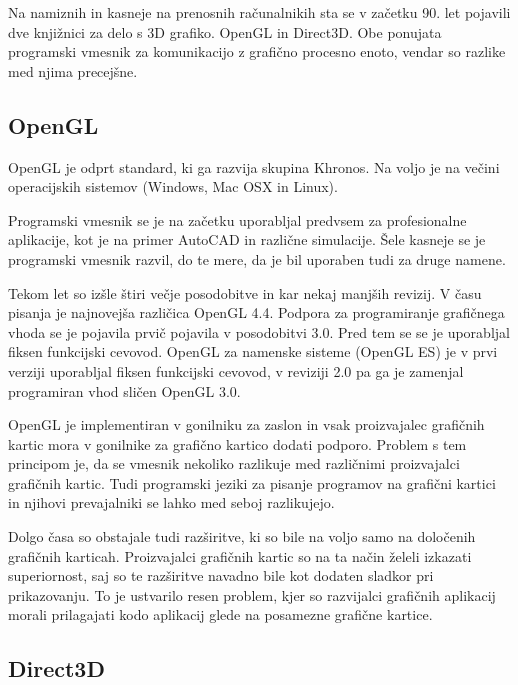 Na namiznih in kasneje na prenosnih računalnikih sta se v začetku 90. let pojavili dve knjižnici za delo s 3D grafiko. OpenGL in Direct3D. Obe ponujata programski vmesnik za komunikacijo z grafično procesno enoto, vendar so razlike med njima precejšne.


\subsection{OpenGL}

OpenGL \cite{opengl} je odprt standard, ki ga razvija skupina Khronos. Na voljo je na večini operacijskih sistemov (Windows, Mac OSX in Linux).

Programski vmesnik se je na začetku uporabljal predvsem za profesionalne aplikacije, kot je na primer AutoCAD in različne simulacije. Šele kasneje se je programski vmesnik razvil, do te mere, da je bil uporaben tudi za druge namene.

Tekom let so izšle štiri večje posodobitve in kar nekaj manjših revizij. V času pisanja je najnovejša različica OpenGL 4.4. Podpora za programiranje grafičnega vhoda se je pojavila prvič pojavila v posodobitvi 3.0. Pred tem se se je uporabljal fiksen funkcijski cevovod. OpenGL za namenske sisteme (OpenGL ES) je v prvi verziji uporabljal fiksen funkcijski cevovod, v reviziji 2.0 pa ga je zamenjal programiran vhod sličen OpenGL 3.0. 

OpenGL je implementiran v gonilniku za zaslon in vsak proizvajalec grafičnih kartic mora v gonilnike za grafično kartico dodati podporo. Problem s tem principom je, da se vmesnik nekoliko razlikuje med različnimi proizvajalci grafičnih kartic. Tudi programski jeziki za pisanje programov na grafični kartici in njihovi prevajalniki se lahko med seboj razlikujejo.

Dolgo časa so obstajale tudi razširitve, ki so bile na voljo samo na določenih grafičnih karticah. Proizvajalci grafičnih kartic so na ta način želeli izkazati superiornost, saj so te razširitve navadno bile kot dodaten sladkor pri prikazovanju. To je ustvarilo resen problem, kjer so razvijalci grafičnih aplikacij morali prilagajati kodo aplikacij glede na posamezne grafične kartice.

\subsection{Direct3D}

